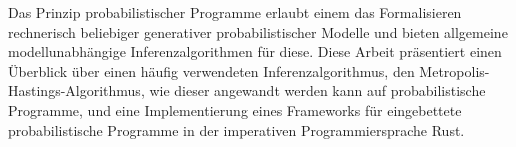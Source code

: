 Das Prinzip probabilistischer Programme erlaubt einem das Formalisieren rechnerisch beliebiger generativer probabilistischer Modelle und bieten allgemeine modellunabhängige Inferenzalgorithmen für diese. Diese Arbeit präsentiert einen Überblick über einen häufig verwendeten Inferenzalgorithmus, den Metropolis-Hastings-Algorithmus, wie dieser angewandt werden kann auf probabilistische Programme, und eine Implementierung eines Frameworks für eingebettete probabilistische Programme in der imperativen Programmiersprache Rust.